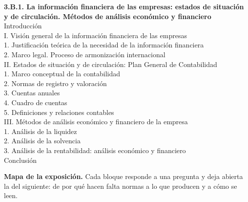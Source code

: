 \documentclass[11pt]{article}
\begin{document}
\begin{esquema}
\textbf{3.B.1. La información financiera de las empresas: estados de situación y de circulación. Métodos de análisis económico y financiero}\\[2pt]
Introducción\\
I. Visión general de la información financiera de las empresas\\
\hspace*{1.5em}1. Justificación teórica de la necesidad de la información financiera\\
\hspace*{1.5em}2. Marco legal. Proceso de armonización internacional\\
II. Estados de situación y de circulación: Plan General de Contabilidad\\
\hspace*{1.5em}1. Marco conceptual de la contabilidad\\
\hspace*{1.5em}2. Normas de registro y valoración\\
\hspace*{1.5em}3. Cuentas anuales\\
\hspace*{1.5em}4. Cuadro de cuentas\\
\hspace*{1.5em}5. Definiciones y relaciones contables\\
III. Métodos de análisis económico y financiero de la empresa\\
\hspace*{1.5em}1. Análisis de la liquidez\\
\hspace*{1.5em}2. Análisis de la solvencia\\
\hspace*{1.5em}3. Análisis de la rentabilidad: análisis económico y financiero\\
Conclusión
\end{esquema}

\begin{anotaciones}
\textbf{Mapa de la exposición.} Cada bloque responde a una pregunta y deja abierta la del siguiente: de por qué hacen falta normas a lo que producen y a cómo se leen.
\begin{infografiacaja}
\caption{Mapa del tema: la pregunta de cada bloque, sus subapartados y el hilo que los une}\label{figu:mapa-tema}
\end{infografiacaja}
\end{anotaciones}
\end{document}
